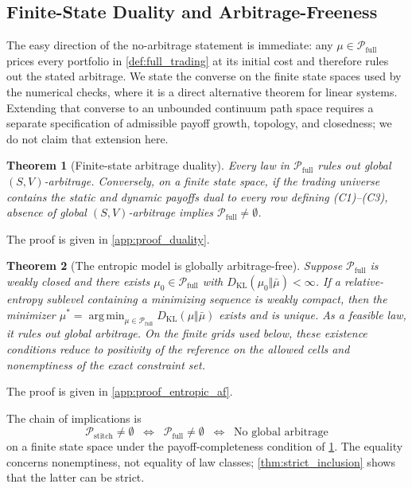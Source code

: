 \documentclass{article}
\newtheorem{theorem}{Theorem}[section]
\newcommand{\argmin}{\operatorname{arg\,min}}
\newcommand{\cP}{\mathcal{P}}
\begin{document}
\subsection{Finite-State Duality and Arbitrage-Freeness}\label{subsec:duality}

The easy direction of the no-arbitrage statement is immediate: any $\mu\in\cP_{\mathrm{full}}$ prices every portfolio in \cref{def:full_trading} at its initial cost and therefore rules out the stated arbitrage.
We state the converse on the finite state spaces used by the numerical checks, where it is a direct alternative theorem for linear systems.
Extending that converse to an unbounded continuum path space requires a separate specification of admissible payoff growth, topology, and closedness; we do not claim that extension here.

\begin{theorem}[Finite-state arbitrage duality]\label{thm:duality}
Every law in $\cP_{\mathrm{full}}$ rules out global $(S,V)$-arbitrage.
Conversely, on a finite state space, if the trading universe contains the static and dynamic payoffs dual to every row defining (C1)--(C3), absence of global $(S,V)$-arbitrage implies $\cP_{\mathrm{full}}\neq\emptyset$.
\end{theorem}
The proof is given in \cref{app:proof_duality}.

\begin{theorem}[The entropic model is globally arbitrage-free]\label{thm:entropic_af}
Suppose $\cP_{\mathrm{full}}$ is weakly closed and there exists $\mu_0\in\cP_{\mathrm{full}}$ with $D_{\mathrm{KL}}(\mu_0\Vert\bar\mu)<\infty$.
If a relative-entropy sublevel containing a minimizing sequence is weakly compact, then the minimizer
$\mu^*=\argmin_{\mu\in\cP_{\mathrm{full}}}D_{\mathrm{KL}}(\mu\Vert\bar\mu)$ exists and is unique.
As a feasible law, it rules out global arbitrage.
On the finite grids used below, these existence conditions reduce to positivity of the reference on the allowed cells and nonemptiness of the exact constraint set.
\end{theorem}
The proof is given in \cref{app:proof_entropic_af}.

The chain of implications is
\begin{equation}\label{eq:chain}
    \cP_{\mathrm{stitch}} \neq \emptyset
    \;\;\Longleftrightarrow\;\;
    \cP_{\mathrm{full}} \neq \emptyset
    \;\;\Longleftrightarrow\;\;
    \text{No global arbitrage}
\end{equation}
on a finite state space under the payoff-completeness condition of \cref{thm:duality}.
The equality concerns nonemptiness, not equality of law classes; \cref{thm:strict_inclusion} shows that the latter can be strict.
\end{document}
